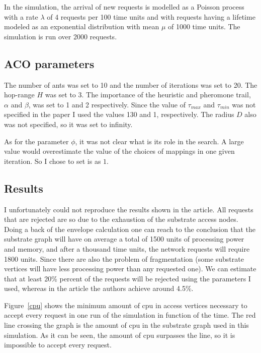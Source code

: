 \documentclass[11pt, a4paper]{article}
\begin{document}
In the simulation, the arrival of new requests is modelled as a Poisson process with a rate $\lambda$ of 4 requests per 100 time units and with requests having a lifetime modeled as an exponential distribution with mean $\mu$ of 1000 time units. The simulation is run over 2000 requests.

\subsection{ACO parameters}
The number of ants was set to 10 and the number of iterations was set to 20. The hop-range $H$ was set to 3. The importance of the heuristic and pheromone trail, $\alpha$ and $\beta$, was set to 1 and 2 respectively. Since the value of $\tau_{max}$ and $\tau_{min}$ was not specified in the paper I used the values 130 and 1, respectively. The radius $D$ also was not specified, so it was set to infinity.

As for the parameter $\phi$, it was not clear what is its role in the search. A large value would overestimate the value of the choices of mappings in one given iteration. So I chose to set is as $1$.

\subsection{Results}
I unfortunately could not reproduce the results shown in the article. All requests that are rejected are so due to the exhaustion of the substrate access nodes. Doing a back of the envelope calculation one can reach to the conclusion that the substrate graph will have on average a total of 1500 units of processing power and memory, and after a thousand time units, the network requests will require 1800 units. Since there are also the problem of fragmentation (some substrate vertices will have less processing power than any requested one). We can estimate that at least 20\% percent of the requests will be rejected using the parameters I used, whereas in the article the authors achieve around 4.5\%.

Figure~\ref{cpu} shows the minimum amount of cpu in access vertices necessary to accept every request in one run of the simulation in function of the time. The red line crossing the graph is the amount of cpu in the substrate graph used in this simulation. As it can be seen, the amount of cpu surpasses the line, so it is impossible to accept every request.
\end{document}
